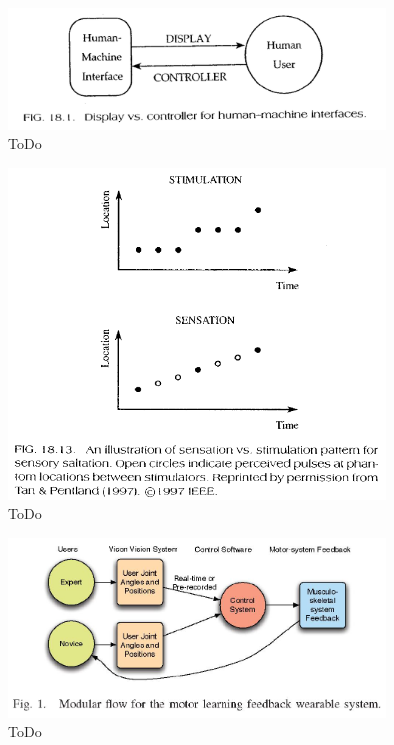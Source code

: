 \documentclass{llncs}					%
\begin{document}
\begin{figure}[htbp]
	\begin{center}
		\includegraphics[width = 10cm]{Grafiken/14-Mensch-Maschine.png}
		\caption{ToDo}
		\label{14-Mensch-Maschine}
	\end{center}
\end{figure}

\begin{figure}[htbp]
	\begin{center}
		\includegraphics[width = 10cm]{Grafiken/14-Sensory-Saltation.png}
		\caption{ToDo}
		\label{14-Sensory-Saltation}
	\end{center}
\end{figure}

\begin{figure}[htbp]
	\begin{center}
		\includegraphics[width = 10cm]{Grafiken/17-Lehrnbeschleunigung-Versuchsaufbau.png}
		\caption{ToDo}
		\label{17-Lehrnbeschleunigung-Versuchsaufbau}
	\end{center}
\end{figure}
\end{document}
